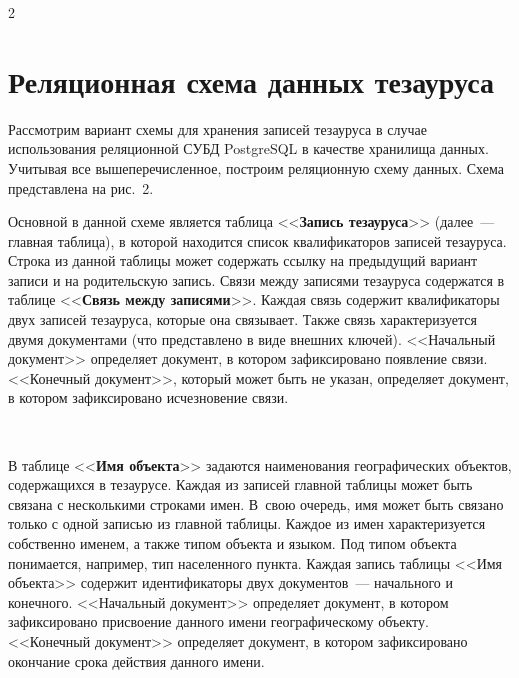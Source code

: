 \begin{multicols}{2}
  \section{Реляционная схема данных тезауруса}
  
  Рассмотрим вариант схемы для хранения записей тезауруса в случае использования 
реляционной СУБД {PostgreSQL} в качестве хранилища данных. Учитывая все 
вышеперечисленное, построим реляционную схему данных. Схема представлена на рис.~2.
  
  Основной в данной схеме является таблица <<\textbf{Запись тезауруса}>> (далее~--- 
главная таблица), в которой находится список квалификаторов записей тезауруса. Строка из 
данной таблицы может содержать ссылку на предыдущий вариант записи и на родительскую 
запись. Связи между записями тезауруса содержатся в таблице <<\textbf{Связь между 
записями}>>. Каждая связь содержит квалификаторы двух записей тезауруса, которые она 
связывает. Также связь характеризуется двумя документами (что представлено в виде 
внешних ключей). <<Начальный документ>> определяет документ, в котором 
зафиксировано появление связи. <<Конечный документ>>, который может быть не указан, 
определяет документ, в котором зафиксировано исчезновение связи.
  
  \begin{figure} %
    \vspace*{1pt}
 \begin{center}
 \mbox{%
 \epsfxsize=164.503mm
 }
 \end{center}
 \vspace*{-9pt}
  \end{figure}
  
  В таблице <<\textbf{Имя объекта}>> задаются наименования географических объектов, 
содержащихся в тезаурусе. Каждая из записей главной таблицы может быть связана с 
несколькими строками имен. В~свою очередь, имя может быть связано только с одной 
записью из главной таблицы. Каждое из имен характеризуется собственно именем, а также 
типом объекта и языком. Под типом объекта понимается, например, тип населенного пункта. 
Каждая запись таблицы <<Имя объекта>> содержит идентификаторы двух документов~--- 
начального и конечного. <<Начальный документ>> определяет документ, в котором 
зафиксировано присвоение данного имени географическому объекту. <<Конечный 
документ>> определяет документ, в котором зафиксировано окончание срока действия 
данного имени.
  

\end{multicols}
